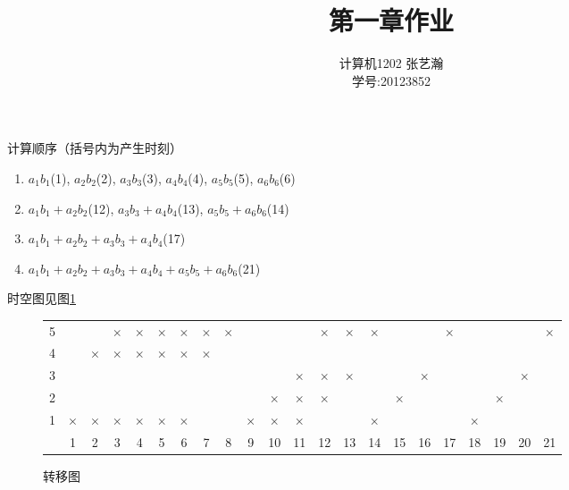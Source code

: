 \documentclass[11pt]{article}
\begin{document}
\title{第一章作业}
\author{计算机1202 \quad 张艺瀚\\学号:20123852}
\maketitle

\thispagestyle{fancy}
\normalsize

\section{}

计算顺序（括号内为产生时刻）
\begin{enumerate}
  \item $a_1b_1$(1), $a_2b_2$(2), $a_3b_3$(3), $a_4b_4$(4), $a_5b_5$(5), $a_6b_6$(6)
  \item $a_1b_1 + a_2b_2$(12), $a_3b_3 + a_4b_4$(13), $a_5b_5 + a_6b_6$(14)
  \item $a_1b_1 + a_2b_2 + a_3b_3 + a_4b_4$(17)
  \item $a_1b_1 + a_2b_2 + a_3b_3 + a_4b_4 + a_5b_5 + a_6b_6$(21)
\end{enumerate}

时空图见图\ref{tab: f1}
\begin{figure}[h!]
  \centering
  \begin{tabular}{c|c|c|c|c|c|c|c|c|c|c|c|c|c|c|c|c|c|c|c|c|c|}  %
    \cline{2-22}
    5 &   &   & $\times$ & $\times$ & $\times$ & $\times$ & $\times$ & $\times$ &   &   &   & $\times$ & $\times$ & $\times$ &   &   & $\times$ &   &   &   & $\times$ \\ \cline{2-22}
    4 &   & $\times$ & $\times$ & $\times$ & $\times$ & $\times$ & $\times$ &   &   &   &   &   &   &   &   &   &   &   &   &   &   \\ \cline{2-22}
    3 &   &   &   &   &   &   &   &   &   &   & $\times$ & $\times$ & $\times$ &   &   & $\times$ &   &   &   & $\times$ &   \\ \cline{2-22}
    2 &   &   &   &   &   &   &   &   &   & $\times$ & $\times$ & $\times$ &   &   & $\times$ &   &   &   & $\times$ &   &   \\ \cline{2-22}
    1 & $\times$ & $\times$ & $\times$ & $\times$ & $\times$ & $\times$ &   &   & $\times$ & $\times$ & $\times$ &   &   & $\times$ &   &   &   & $\times$ &   &   &   \\ \cline{2-22}
    \multicolumn{1}{r}{} & \multicolumn{1}{c}{1} & \multicolumn{1}{c}{2} & \multicolumn{1}{c}{3} & \multicolumn{1}{c}{4} & \multicolumn{1}{c}{5} & \multicolumn{1}{c}{6} & \multicolumn{1}{c}{7} & \multicolumn{1}{c}{8} & \multicolumn{1}{c}{9} & \multicolumn{1}{c}{10} & \multicolumn{1}{c}{11} & \multicolumn{1}{c}{12} & \multicolumn{1}{c}{13} & \multicolumn{1}{c}{14} & \multicolumn{1}{c}{15} & \multicolumn{1}{c}{16} & \multicolumn{1}{c}{17} & \multicolumn{1}{c}{18} & \multicolumn{1}{c}{19} & \multicolumn{1}{c}{20} & \multicolumn{1}{c}{21} \\ 
  \end{tabular}
  \caption{转移图}
  \label{tab: f1}
\end{figure}
\end{document}
